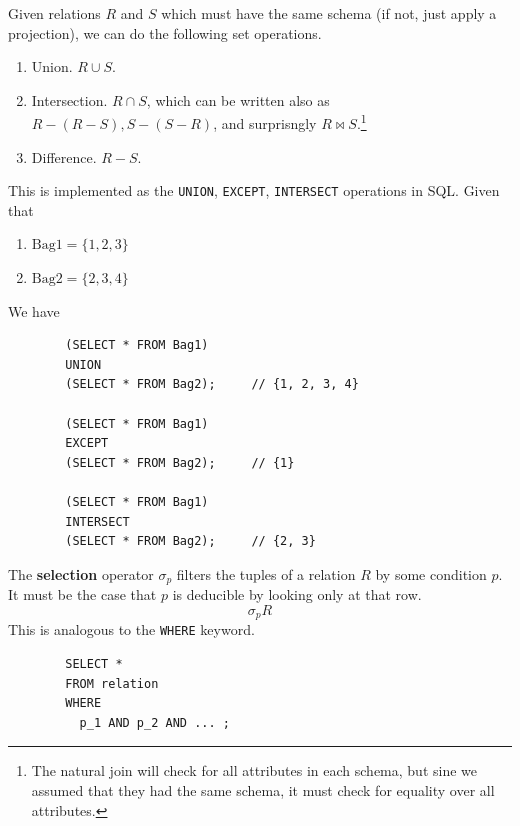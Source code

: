 \documentclass{article}
\begin{document}
    \begin{definition}
      Given relations $R$ and $S$ which must have the same schema (if not, just apply a projection), we can do the following set operations. 
      \begin{enumerate}
        \item Union. $R \cup S$. 
        \item Intersection. $R \cap S$, which can be written also as $R - (R - S), S - (S - R)$, and surprisngly $R \bowtie S$.\footnote{The natural join will check for all attributes in each schema, but sine we assumed that they had the same schema, it must check for equality over all attributes.}
        \item Difference. $R - S$. 
      \end{enumerate}
      This is implemented as the \texttt{UNION}, \texttt{EXCEPT}, \texttt{INTERSECT} operations in SQL. Given that 
      \begin{enumerate}
        \item $\mathrm{Bag1} = \{1, 2, 3\}$
        \item $\mathrm{Bag2} = \{2, 3, 4\}$
      \end{enumerate}
      We have 
      \begin{lstlisting}
        (SELECT * FROM Bag1) 
        UNION 
        (SELECT * FROM Bag2);     // {1, 2, 3, 4}

        (SELECT * FROM Bag1) 
        EXCEPT 
        (SELECT * FROM Bag2);     // {1} 

        (SELECT * FROM Bag1) 
        INTERSECT 
        (SELECT * FROM Bag2);     // {2, 3}
      \end{lstlisting}
    \end{definition}

    \begin{definition}[Selection]
      The \textbf{selection} operator $\sigma_p$ filters the tuples of a relation $R$ by some condition $p$. It must be the case that $p$ is deducible by looking only at that row. 
      \begin{equation}
        \sigma_p R
      \end{equation}
      This is analogous to the \texttt{WHERE} keyword. 
      \begin{lstlisting}
        SELECT * 
        FROM relation 
        WHERE 
          p_1 AND p_2 AND ... ; 
      \end{lstlisting}
    \end{definition}
\end{document}
